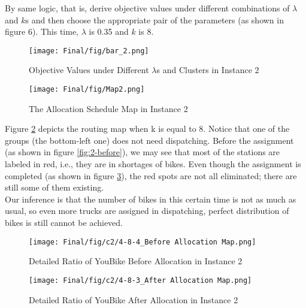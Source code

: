 \documentclass[a4paper, 12pt]{article}%
\theoremstyle{definition}
\begin{document}


\noindent By same logic, that is, derive objective values under different combinations of $\lambda$ and $k$s and then choose the appropriate pair of the parameters (as shown in figure 6). This time, $\lambda$ is 0.35 and $k$ is 8.

\begin{figure}[hbt]
    \centering
    \texttt{[image: Final/fig/bar\_2.png]}
    \caption{Objective Values under Different $\lambda$s and Clusters in Instance 2}
    \label{fig:bar-2}
\end{figure}
\begin{figure}[hbt]
    \centering
    \texttt{[image: Final/fig/Map2.png]}
    \caption{The Allocation Schedule Map in Instance 2}
    \label{fig:2-map}
\end{figure}

\noindent Figure \ref{fig:2-map} depicts the routing map when k is equal to 8. Notice that one of the groups (the bottom-left one) does not need dispatching. Before the assignment (as shown in figure \ref{fig:2-before}), we may see that most of the stations are labeled in red, i.e., they are in shortages of bikes. Even though the assignment is completed (as shown in figure \ref{fig:2-after}), the red spots are not all eliminated; there are still some of them existing. \\

\noindent Our inference is that the number of bikes in this certain time is not as much as usual, so even more trucks are assigned in dispatching, perfect distribution of bikes is still cannot be achieved.

\begin{figure}[hbt]
\centering
	\begin{minipage}[b]{0.45\textwidth}
		\texttt{[image: Final/fig/c2/4-8-4\_Before Allocation Map.png]}
		\caption{Detailed Ratio of YouBike Before Allocation in Instance 2}
		\label{fig:2-before}
	\end{minipage}
	\begin{minipage}[b]{0.05\textwidth}
		\quad
	\end{minipage}	
	\begin{minipage}[b]{0.45\textwidth}
		\texttt{[image: Final/fig/c2/4-8-3\_After Allocation Map.png]}
		\caption{Detailed Ratio of YouBike After Allocation in Instance 2}
		\label{fig:2-after}
	\end{minipage}
\end{figure}
\end{document}
